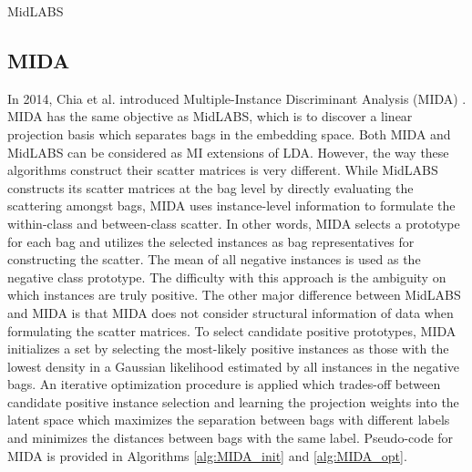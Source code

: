 \begin{algorithm}[H]
	\caption{MidLABS}
	\label{alg:MidLABS}
	\begin{algorithmic}[1]
		\EndFor             
	\end{algorithmic}
\end{algorithm}


\subsection{MIDA} \label{sec:MIDA}
In 2014, Chia et al. introduced Multiple-Instance Discriminant Analysis (MIDA) \citep{Chai2014MIDA}.  MIDA has the same objective as MidLABS, which is to discover a linear projection basis which separates bags in the embedding space.  Both MIDA and MidLABS  can be considered as MI extensions of LDA. However, the way these algorithms construct their scatter matrices is very different.  While MidLABS constructs its  scatter matrices at the bag level by directly evaluating the scattering amongst bags, MIDA  uses instance-level information to formulate the within-class and between-class scatter.  In other words, MIDA selects a prototype for each bag and utilizes the selected instances as bag representatives for constructing the scatter.  The mean of all negative instances is used as the negative class prototype. The difficulty with this approach is the ambiguity on which instances are truly positive.  The other major difference between MidLABS and MIDA is that MIDA does not consider structural information of data when formulating the scatter matrices. To select candidate positive prototypes, MIDA initializes a set by selecting the most-likely positive instances as those with the lowest density in a Gaussian likelihood estimated by all instances in the negative bags.  An iterative optimization procedure is applied which trades-off between candidate positive instance selection and learning the projection weights into the latent space which maximizes the separation between bags with different labels and minimizes the distances between bags with the same label.  Pseudo-code for MIDA  is provided in Algorithms \ref{alg:MIDA_init} and \ref{alg:MIDA_opt}.

